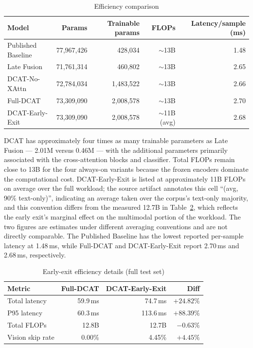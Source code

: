 \documentclass[10pt,twoside]{article}
\begin{document}
\begin{table}[t]
\centering
\caption{Efficiency comparison}
\label{tab:efficiency}
\small
\setlength{\tabcolsep}{3.6pt}
\begin{tabular}{lrrrr}
\toprule
Model & Params & Trainable params & FLOPs & Latency/sample (ms) \\
\midrule
Published Baseline & 77,967,426 & 428,034 & $\sim$13B & 1.48 \\
Late Fusion & 71,761,314 & 460,802 & $\sim$13B & 2.65 \\
DCAT-No-XAttn & 72,784,034 & 1,483,522 & $\sim$13B & 2.66 \\
Full-DCAT & 73,309,090 & 2,008,578 & $\sim$13B & 2.70 \\
DCAT-Early-Exit & 73,309,090 & 2,008,578 & $\sim$11B (avg) & 2.68 \\
\bottomrule
\end{tabular}
\end{table}

DCAT has approximately four times as many trainable parameters as Late Fusion --- 2.01M versus 0.46M --- with the additional parameters primarily associated with the cross-attention blocks and classifier. Total FLOPs remain close to 13B for the four always-on variants because the frozen encoders dominate the computational cost. DCAT-Early-Exit is listed at approximately 11B FLOPs on average over the full workload; the source artifact annotates this cell ``(avg, 90\% text-only)'', indicating an average taken over the corpus's text-only majority, and this convention differs from the measured 12.7B in Table~\ref{tab:earlyexit}, which reflects the early exit's marginal effect on the multimodal portion of the workload. The two figures are estimates under different averaging conventions and are not directly comparable. The Published Baseline has the lowest reported per-sample latency at 1.48\,ms, while Full-DCAT and DCAT-Early-Exit report 2.70\,ms and 2.68\,ms, respectively.

\begin{table}[t]
\centering
\caption{Early-exit efficiency details (full test set)}
\label{tab:earlyexit}
\small
\begin{tabular}{lrrr}
\toprule
Metric & Full-DCAT & DCAT-Early-Exit & Diff \\
\midrule
Total latency & 59.9\,ms & 74.7\,ms & $+24.82\%$ \\
P95 latency & 60.3\,ms & 113.6\,ms & $+88.39\%$ \\
Total FLOPs & 12.8B & 12.7B & $-0.63\%$ \\
Vision skip rate & 0.00\% & 4.45\% & $+4.45\%$ \\
\bottomrule
\end{tabular}
\end{table}
\end{document}

